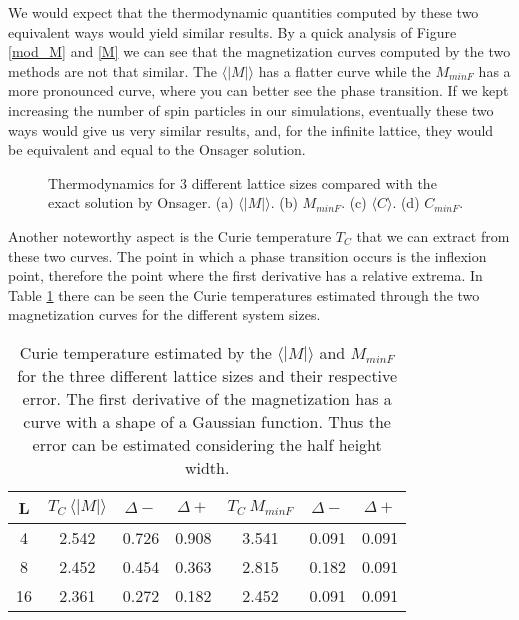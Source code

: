	We would expect that the thermodynamic quantities computed by these two equivalent ways would yield similar results. By a quick analysis of Figure \ref{mod_M} and \ref{M} we can see that the magnetization curves computed by the two methods are not that similar. The $\langle |M| \rangle$ has a flatter curve while the $M_{minF}$ has a more pronounced curve, where you can better see the phase transition. If we kept increasing the number of spin particles in our simulations, eventually these two ways would give us very similar results, and, for the infinite lattice, they would be equivalent and equal to the Onsager solution. 
\begin{figure}[h]
	\centering
	
	\caption{Thermodynamics for 3 different lattice sizes compared with the exact solution by Onsager. (a) $\langle |M| \rangle$. (b) $M_{minF}$. (c) $\langle C \rangle$. (d) $C_{minF}$.}
	\label{thermo_4}
\end{figure}
	Another noteworthy aspect is the Curie temperature $T_C$ that we can extract from these two curves. The point in which a phase transition occurs is the inflexion point, therefore the point where the first derivative has a relative extrema. In Table \ref{TC_table} there can be seen the Curie temperatures estimated through the two magnetization curves for the different system sizes. 

\begin{table}[h]
\centering
\caption{Curie temperature estimated by the $\langle |M| \rangle$ and $M_{minF}$ for the three different lattice sizes and their respective error. The first derivative of the magnetization has a curve with a shape of a Gaussian function. Thus the error can be estimated considering the half height width.}
\begin{tabular}{c|ccc|ccc}
L  & $T_C\ \langle |M| \rangle$ & $\Delta -$ & $\Delta +$ & $T_C\ M_{minF}$ & $\Delta -$ & $\Delta +$ \\ \hline
4  & 2.542                                                 & 0.726                  & 0.908         & 3.541           & 0.091                  & 0.091                \\
8  & 2.452                                                 & 0.454                   & 0.363                  & 2.815           & 0.182         & 0.091                  \\
16 & 2.361                                                 & 0.272                  & 0.182                  & 2.452           & 0.091                  & 0.091                 
\end{tabular}
\label{TC_table}
\end{table}

